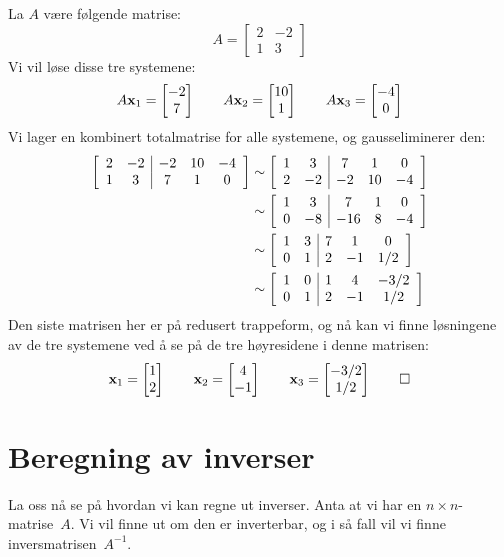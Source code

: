 \begin{ex}
La $A$ være følgende matrise:
\[
A =
\begin{bmatrix}
2 & -2 \\
1 &  3
\end{bmatrix}
\]
Vi vil løse disse tre systemene:
\[
A \mathbf{x}_1 = \begin{bmatrix} -2 \\ 7 \end{bmatrix}
\qquad
A \mathbf{x}_2 = \begin{bmatrix} 10 \\ 1 \end{bmatrix}
\qquad
A \mathbf{x}_3 = \begin{bmatrix} -4 \\ 0 \end{bmatrix}
\]
Vi lager en kombinert totalmatrise for alle systemene, og
gausseliminerer den:
\begin{align*}
\left[
\begin{array}{cc|ccc}
2 & -2 & -2 & 10 & -4 \\
1 &  3 &  7 &  1 &  0
\end{array}
\right]
&\sim
\left[
\begin{array}{cc|ccc}
1 &  3 &  7 &  1 &  0 \\
2 & -2 & -2 & 10 & -4
\end{array}
\right]
\\
&\sim
\left[
\begin{array}{cc|ccc}
1 &  3 &   7 &  1 &  0 \\
0 & -8 & -16 &  8 & -4
\end{array}
\right]
\\
&\sim
\left[
\begin{array}{cc|ccc}
1 & 3 & 7 &  1 &   0 \\
0 & 1 & 2 & -1 & 1/2
\end{array}
\right]
\\
&\sim
\left[
\begin{array}{cc|ccc}
1 & 0 & 1 &  4 & -3/2 \\
0 & 1 & 2 & -1 &  1/2
\end{array}
\right]
\end{align*}
Den siste matrisen her er på redusert trappeform, og nå kan vi finne
løsningene av de tre systemene ved å se på de tre høyresidene i denne
matrisen:
\[
\mathbf{x}_1 = \begin{bmatrix} 1 \\ 2 \end{bmatrix}
\qquad
\mathbf{x}_2 = \begin{bmatrix} 4 \\ -1 \end{bmatrix}
\qquad
\mathbf{x}_3 = \begin{bmatrix} -3/2 \\ 1/2 \end{bmatrix}
\qedhere
\]
\end{ex}


\section*{Beregning av inverser}

La oss nå se på hvordan vi kan regne ut inverser.  Anta at vi har en
$n \times n$-matrise~$A$.  Vi vil finne ut om den er inverterbar, og i
så fall vil vi finne inversmatrisen~$A^{-1}$.

